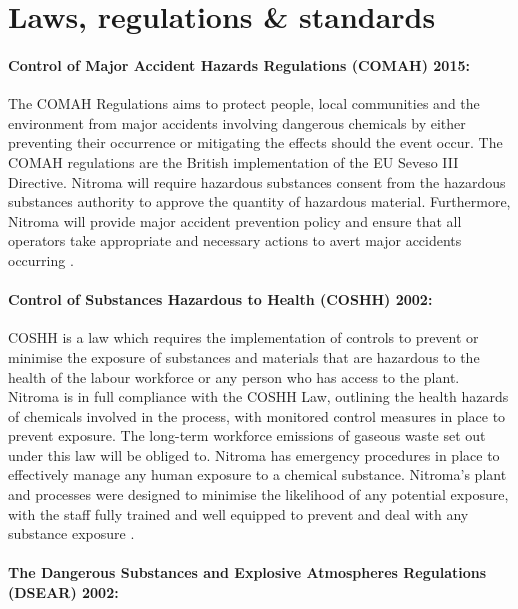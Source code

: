 \section{Laws, regulations \& standards}

\paragraph{Control of Major Accident Hazards Regulations (COMAH) 2015:} 

The COMAH Regulations aims to protect people, local communities and the environment from major accidents involving dangerous chemicals by either preventing their occurrence or mitigating the effects should the event occur. The COMAH regulations are the British implementation of the EU Seveso III Directive. Nitroma will require hazardous substances consent from the hazardous substances authority to approve the quantity of hazardous material. Furthermore, Nitroma will provide major accident prevention policy and ensure that all operators take appropriate and necessary actions to avert major accidents occurring \cite{health_and_safety_executive_understanding_2015}. 

\paragraph{Control of Substances Hazardous to Health (COSHH) 2002:}

COSHH is a law which requires the implementation of controls to prevent or minimise the exposure of substances and materials that are hazardous to the health of the labour workforce or any person who has access to the plant. Nitroma is in full compliance with the COSHH Law, outlining the health hazards of chemicals involved in the process, with monitored control measures in place to prevent exposure. The long-term workforce emissions of gaseous waste set out under this law will be obliged to. Nitroma has emergency procedures in place to effectively manage any human exposure to a chemical substance. Nitroma’s plant and processes were designed to minimise the likelihood of any potential exposure, with the staff fully trained and well equipped to prevent and deal with any substance exposure \cite{health_and_safety_executive_control_nodate}. 

\paragraph{The Dangerous Substances and Explosive Atmospheres Regulations (DSEAR) 2002:}


